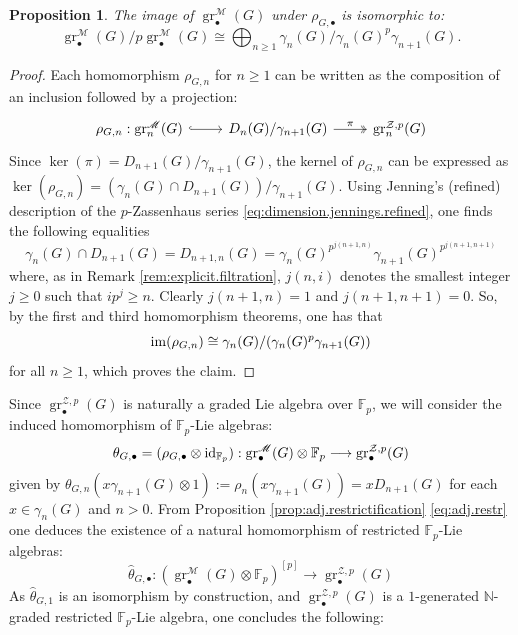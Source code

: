 \documentclass{amsart}
\theoremstyle{plain}
\newtheorem{prop}{Proposition}
\theoremstyle{definition}
\numberwithin{theorem}{section}
\numberwithin{equation}{section}
\newcommand{\grM}{\operatorname{gr}^{\mathscr M}}
\newcommand{\grZ}{\operatorname{gr}^{{\mathcal Z}, p}}
\newcommand{\FF}{\mathbb{F}}
\begin{document}
\begin{prop}
    The image of $\grM_\bullet(G)$ under $\rho_{G, \bullet}$ is isomorphic to:
    \begin{equation}\label{eq:im.rho}
        \grM_\bullet(G)/p\grM_\bullet(G) \cong \bigoplus_{n \geq 1} \gamma_n(G)/\gamma_n(G)^p\gamma_{n+1}(G) .
    \end{equation}
\end{prop}
\begin{proof}
Each homomorphism $\rho_{G, n}$ for $n\geq 1$ can be written as the composition of an inclusion followed by a projection:
\[\begin{tikzcd}
    \rho_{G, n} : \grM_n(G) \arrow[r, hook] & D_{n}(G)/\gamma_{n+1}(G) \arrow[r, two heads, "\pi"] & \grZ_n(G) 
\end{tikzcd}\]
    Since $\ker(\pi) = D_{n+1}(G)/\gamma_{n+1}(G)$, the kernel of $\rho_{G, n}$ can be expressed as $\ker(\rho_{G, n}) = (\gamma_n(G) \cap D_{n+1}(G))/{\gamma_{n+1}(G)}$. Using Jenning's (refined) description of the $p$-Zassenhaus series \eqref{eq:dimension.jennings.refined}, one finds the following equalities
    \[
        \gamma_n(G) \cap D_{n+1}(G) = D_{n+1, n}(G) = \gamma_n(G)^{p^{j(n+1, n)}}\gamma_{n+1}(G)^{p^{j(n+1, n+1)}} 
    \]
    where, as in Remark \ref{rem:explicit.filtration}, $j(n, i)$ denotes the smallest integer $j \geq 0$ such that $ip^j \geq n$. Clearly $j(n+1, n) = 1$ and $j(n+1, n+1) = 0$. So, by the first and third homomorphism theorems, one has that
    \[
        {\rm im}(\rho_{G, n}) \cong \gamma_n(G)/(\gamma_n(G)^p\gamma_{n+1}(G)) 
    \]
    for all $n \geq 1$, which proves the claim.
\end{proof}
Since $\grZ_\bullet(G)$ is naturally a graded Lie algebra over $\FF_p$, we will consider the induced homomorphism of $\FF_p$-Lie algebras: 
\begin{equation}
    \theta_{G, \bullet} = (\rho_{G, \bullet} \otimes {\rm id}_{\FF_p}) : \grM_\bullet(G) \otimes \FF_p \longrightarrow \grZ_\bullet(G)
\end{equation}
given by $\theta_{G, n}(x \gamma_{n+1}(G) \otimes 1) := \rho_n(x\gamma_{n+1}(G)) = xD_{n+1}(G)$ for each $x \in \gamma_n(G)$ and $n > 0$. From Proposition \ref{prop:adj.restrictification} \eqref{eq:adj.restr}
one deduces the existence of a natural homomorphism of restricted $\FF_p$-Lie algebras:
\begin{equation}\label{eq:nat.restr}
    \hat \theta_{G, \bullet} : (\grM_\bullet(G) \otimes \FF_p)^{[p]} \longrightarrow \grZ_\bullet(G)
\end{equation}
\noindent
As $\hat{\theta}_{G, 1}$ is an isomorphism by construction, and $\grZ_\bullet(G)$ is a $1$-generated $\mathbb N$-graded restricted $\FF_p$-Lie algebra, one concludes the following:
\end{document}
